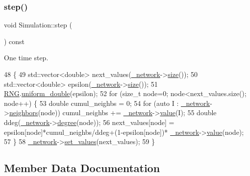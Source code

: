 \subsubsection{\texorpdfstring{step()}{step()}}
{\footnotesize\ttfamily void Simulation\+::step (\begin{DoxyParamCaption}{ }\end{DoxyParamCaption}) const\hspace{0.3cm}{\ttfamily [private]}}

One time step. 
\begin{DoxyCode}
48                             \{
49     std::vector<double> next\_values(\mbox{\hyperlink{classSimulation_a5f1d8152b13bc4640c8a3fddcfe7eae9}{\_network}}->\mbox{\hyperlink{classNetwork_a41c54d12d861883170b5c5abca3a7bc8}{size}}());
50     std::vector<double> epsilon(\mbox{\hyperlink{classSimulation_a5f1d8152b13bc4640c8a3fddcfe7eae9}{\_network}}->\mbox{\hyperlink{classNetwork_a41c54d12d861883170b5c5abca3a7bc8}{size}}());
51     \mbox{\hyperlink{main_8cpp_aa68627d02426951087dcb2ed1f32099c}{RNG}}.\mbox{\hyperlink{classRandomNumbers_ae226c129494f9055ac37ed1af943d010}{uniform\_double}}(epsilon);
52     \textcolor{keywordflow}{for} (\textcolor{keywordtype}{size\_t} node=0; node<next\_values.size(); node++) \{
53         \textcolor{keywordtype}{double} cumul\_neighbs = 0;
54         \textcolor{keywordflow}{for} (\textcolor{keyword}{auto} I : \mbox{\hyperlink{classSimulation_a5f1d8152b13bc4640c8a3fddcfe7eae9}{\_network}}->\mbox{\hyperlink{classNetwork_af57d8903e88666b66fd3cc3b8de143da}{neighbors}}(node)) cumul\_neighbs += 
      \mbox{\hyperlink{classSimulation_a5f1d8152b13bc4640c8a3fddcfe7eae9}{\_network}}->\mbox{\hyperlink{classNetwork_a9b9cb94c0af24ce5417d840727fb5ad3}{value}}(I);
55         \textcolor{keywordtype}{double} ddeg(\mbox{\hyperlink{classSimulation_a5f1d8152b13bc4640c8a3fddcfe7eae9}{\_network}}->\mbox{\hyperlink{classNetwork_a7bd299baab15f2652fa697b1afde3977}{degree}}(node));
56         next\_values[node] = epsilon[node]*cumul\_neighbs/ddeg+(1-epsilon[node])*
      \mbox{\hyperlink{classSimulation_a5f1d8152b13bc4640c8a3fddcfe7eae9}{\_network}}->\mbox{\hyperlink{classNetwork_a9b9cb94c0af24ce5417d840727fb5ad3}{value}}(node);
57     \}
58     \mbox{\hyperlink{classSimulation_a5f1d8152b13bc4640c8a3fddcfe7eae9}{\_network}}->\mbox{\hyperlink{classNetwork_aee0b1927ab5693cf90a00fe4d505c427}{set\_values}}(next\_values);
59 \}
\end{DoxyCode}


\subsection{Member Data Documentation}
\mbox{\label{classSimulation_a5f1d8152b13bc4640c8a3fddcfe7eae9}} 
